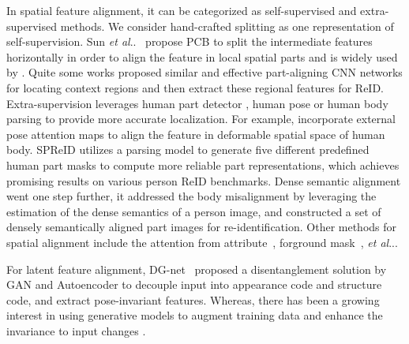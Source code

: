 \documentclass[runningheads]{llncs}
\makeatletter
\DeclareRobustCommand\onedot{\futurelet\@let@token\@onedot}
\def\@onedot{\ifx\@let@token.\else.\null\fi\xspace}
\def\etal{\emph{et al}\onedot}
\makeatother
\begin{document}
In spatial feature alignment, it can be categorized as self-supervised and extra-supervised methods. We consider hand-crafted splitting as one representation of self-supervision. Sun \etal~\cite{sun-pcb} propose PCB to split the intermediate features horizontally in order to align the feature in local spatial parts and is widely used by \cite{fu-hpyramid,guo-part,quan-autopart,sun-perceive,zheng-pyramidal}.
Quite some works \cite{jiehu-squeeze,dangweili-cvpr2017,shuangli-cvpr2018,weili-cvpr2018,jingxu-cvpr2018} proposed similar and effective part-aligning CNN networks for locating context regions and then extract these regional features for ReID.
Extra-supervision leverages human part detector \cite{haiyu-cvpr2017}, human pose \cite{liu-pose} or human body parsing \cite{kalayeh-semanticpart} to provide more accurate localization. For example, \cite{miao-pose,saquib-pose,subramaniam-pose,xu-pose} incorporate external pose attention maps to align the feature in deformable spatial space of human body. SPReID \cite{kalayeh-semanticpart} utilizes a parsing model to generate five different predefined human part masks to compute more reliable part representations, which achieves promising results on various person ReID benchmarks. Dense semantic alignment \cite{zhang-densely} went one step further, it addressed the body misalignment by leveraging the estimation of the dense semantics of a person image, and constructed a set of densely semantically aligned part images for re-identification. Other methods for spatial alignment include the attention from attribute~\cite{tay-aanet}, forground mask~\cite{tian-bgmask}, \etal.


For latent feature alignment, DG-net~\cite{zheng-joint} proposed a disentanglement solution by GAN and Autoencoder to decouple input into appearance code and structure code, and extract pose-invariant features. Whereas, there has been a growing interest in using generative models to augment training data and enhance the invariance to input changes \cite{zhedong-iccv2017,xiang-eccv2018,yan-tip2018}. 
\end{document}
